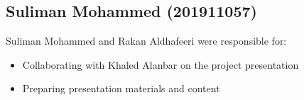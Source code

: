\documentclass[11pt,a4paper]{article}
\begin{document}
\subsection{Suliman Mohammed (201911057)}
Suliman Mohammed and Rakan Aldhafeeri were responsible for:
\begin{itemize}
    \item Collaborating with Khaled Alanbar on the project presentation
    \item Preparing presentation materials and content
\end{itemize}
\end{document}
